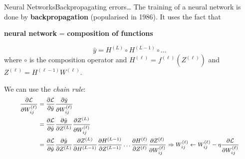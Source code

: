 \begin{frame}{Neural Networks}{Backpropagating errors\dots}
    The training of a neural network is done by \textbf{backpropagation} (popularised in 1986).
    It uses the fact that
    \begin{center}
        \textbf{neural network} = \textbf{composition of functions}
    \end{center}
    \begin{equation*}
        \hat{y}
        =
        H^{(L)}
        \circ
        H^{(L-1)}
        \circ
        \dots
    \end{equation*}
    where $\circ$ is the composition operator and $H^{(\ell)} = f^{(\ell)}(Z^{(\ell)})$ and $Z^{(\ell)} = H^{(\ell-1)} W^{(\ell)}$.

    \vfill \pause

    We can use the \emph{chain rule}:
    \begin{equation*}
        \footnotesize
        \begin{split}
            \pdv{\mathcal{L}}{W^{(\ell)}_{ij}}
            & =
            \pdv{\mathcal{L}}{\hat{y}}
            \pdv{\hat{y}}{W^{(\ell)}_{ij}} \\
            & =
            \pdv{\mathcal{L}}{\hat{y}}
            \pdv{\hat{y}}{Z^{(L)}}
            \pdv{Z^{(L)}}{W^{(\ell)}_{ij}} \\
            & =
            \pdv{\mathcal{L}}{\hat{y}}
            \pdv{\hat{y}}{Z^{(L)}}
            \pdv{Z^{(L)}}{H^{(L-1)}}
            \pdv{H^{(L-1)}}{Z^{(L-1)}}
            \dots
            \pdv{H^{(\ell)}}{Z^{(\ell)}}
            \pdv{Z^{(\ell)}}{W^{(\ell)}_{ij}}
            \Rightarrow
            W^{(\ell)}_{ij} \gets W^{(\ell)}_{ij} - \eta \pdv{\mathcal{L}}{W^{(\ell)}_{ij}}
        \end{split}
    \end{equation*}
\end{frame}

